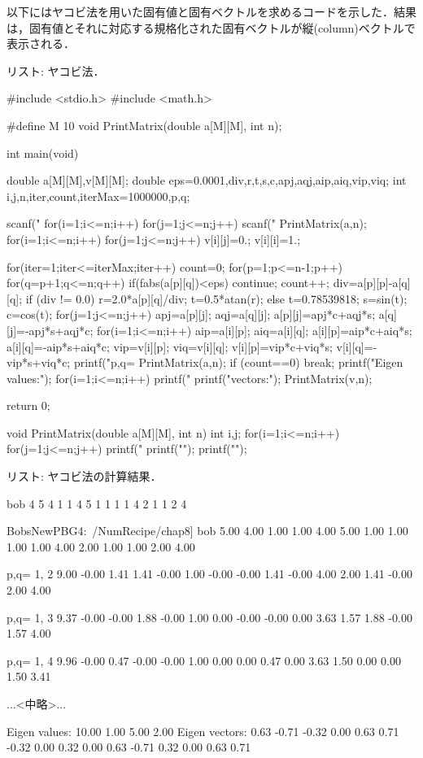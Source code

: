 以下にはヤコビ法を用いた固有値と固有ベクトルを求めるコードを示した．結果は，固有値とそれに対応する規格化された固有ベクトルが縦(column)ベクトルで表示される．

リスト: ヤコビ法．
\begin{MapleInput}
#include <stdio.h>
#include <math.h>

#define M 10
void PrintMatrix(double a[M][M], int n);

int main(void){
  double a[M][M],v[M][M];
  double eps=0.0001,div,r,t,s,c,apj,aqj,aip,aiq,vip,viq;
  int i,j,n,iter,count,iterMax=1000000,p,q;
  
  scanf("%
  for(i=1;i<=n;i++){
    for(j=1;j<=n;j++) scanf("%
  }
  PrintMatrix(a,n);
  for(i=1;i<=n;i++){
    for(j=1;j<=n;j++) v[i][j]=0.;    
    v[i][i]=1.;
  }
  
  for(iter=1;iter<=iterMax;iter++){
    count=0;
    for(p=1;p<=n-1;p++){
      for(q=p+1;q<=n;q++){
	if(fabs(a[p][q])<eps) continue;
	count++;
	div=a[p][p]-a[q][q];
	if (div != 0.0){
	  r=2.0*a[p][q]/div;
	  t=0.5*atan(r);
	} else {
	  t=0.78539818;
	}
	s=sin(t);
	c=cos(t);
	for(j=1;j<=n;j++){
	  apj=a[p][j];
	  aqj=a[q][j];
	  a[p][j]=apj*c+aqj*s;
	  a[q][j]=-apj*s+aqj*c;
	}
	for(i=1;i<=n;i++){
	  aip=a[i][p];
	  aiq=a[i][q];
	  a[i][p]=aip*c+aiq*s;
	  a[i][q]=-aip*s+aiq*c;
	  vip=v[i][p];
	  viq=v[i][q];
	  v[i][p]=vip*c+viq*s;
	  v[i][q]=-vip*s+viq*c;
	}
	printf("p,q=%
	PrintMatrix(a,n);
      }
    }
    if (count==0) break;
  }
  printf("Eigen values:\n");
  for(i=1;i<=n;i++) printf("%
  printf("\nEigen vectors:\n");
  PrintMatrix(v,n);
  
  return 0;
}

void PrintMatrix(double a[M][M], int n){
  int i,j;
  for(i=1;i<=n;i++){
    for(j=1;j<=n;j++) printf("%
    printf("\n");
  }
  printf("\n");
}
\end{MapleInput}


リスト: ヤコビ法の計算結果．

\begin{MapleError}
 bob%
4
5 4 1 1
4 5 1 1
1 1 4 2
1 1 2 4

BobsNewPBG4:~/NumRecipe/chap8] bob%
  5.00  4.00  1.00  1.00
  4.00  5.00  1.00  1.00
  1.00  1.00  4.00  2.00
  1.00  1.00  2.00  4.00

p,q=  1,  2
  9.00 -0.00  1.41  1.41
 -0.00  1.00 -0.00 -0.00
  1.41 -0.00  4.00  2.00
  1.41 -0.00  2.00  4.00

p,q=  1,  3
  9.37 -0.00 -0.00  1.88
 -0.00  1.00  0.00 -0.00
 -0.00  0.00  3.63  1.57
  1.88 -0.00  1.57  4.00

p,q=  1,  4
  9.96 -0.00  0.47 -0.00
 -0.00  1.00  0.00  0.00
  0.47  0.00  3.63  1.50
  0.00  0.00  1.50  3.41

...<中略>...

Eigen values:
 10.00  1.00  5.00  2.00
Eigen vectors:
  0.63 -0.71 -0.32  0.00
  0.63  0.71 -0.32  0.00
  0.32  0.00  0.63 -0.71
  0.32  0.00  0.63  0.71
\end{MapleError}


